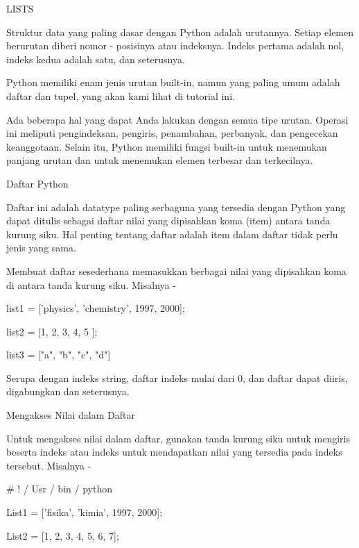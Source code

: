  
LISTS \par
Struktur data yang paling dasar dengan Python adalah urutannya. Setiap elemen berurutan diberi nomor - posisinya atau indeksnya. Indeks pertama adalah nol, indeks kedua adalah satu, dan seterusnya. \par
\vspace{12pt}
Python memiliki enam jenis urutan built-in, namun yang paling umum adalah daftar dan tupel, yang akan kami lihat di tutorial ini. \par
Ada beberapa hal yang dapat Anda lakukan dengan semua tipe urutan. Operasi ini meliputi pengindeksan, pengiris, penambahan, perbanyak, dan pengecekan keanggotaan. Selain itu, Python memiliki fungsi built-in untuk menemukan panjang urutan dan untuk menemukan elemen terbesar dan terkecilnya. \par
\vspace{12pt}
Daftar Python \par
\vspace{12pt}
Daftar ini adalah datatype paling serbaguna yang tersedia dengan Python yang dapat ditulis sebagai daftar nilai yang dipisahkan koma (item) antara tanda kurung siku. Hal penting tentang daftar adalah item dalam daftar tidak perlu jenis yang sama. \par
Membuat daftar sesederhana memasukkan berbagai nilai yang dipisahkan koma di antara tanda kurung siku. Misalnya - \par
\vspace{12pt}
list1 = ['physics', 'chemistry', 1997, 2000]; \par
list2 = [1, 2, 3, 4, 5 ]; \par
list3 = ["a", "b", "c", "d"] \par
Serupa dengan indeks string, daftar indeks mulai dari 0, dan daftar dapat diiris, digabungkan dan seterusnya. \par
Mengakses Nilai dalam Daftar \par
Untuk mengakses nilai dalam daftar, gunakan tanda kurung siku untuk mengiris beserta indeks atau indeks untuk mendapatkan nilai yang tersedia pada indeks tersebut. Misalnya - \par
\vspace{12pt}
   \#  ! / Usr / bin / python \par
\vspace{12pt}
List1 = ['fisika', 'kimia', 1997, 2000]; \par
List2 = [1, 2, 3, 4, 5, 6, 7]; \par
\vspace{12pt}
